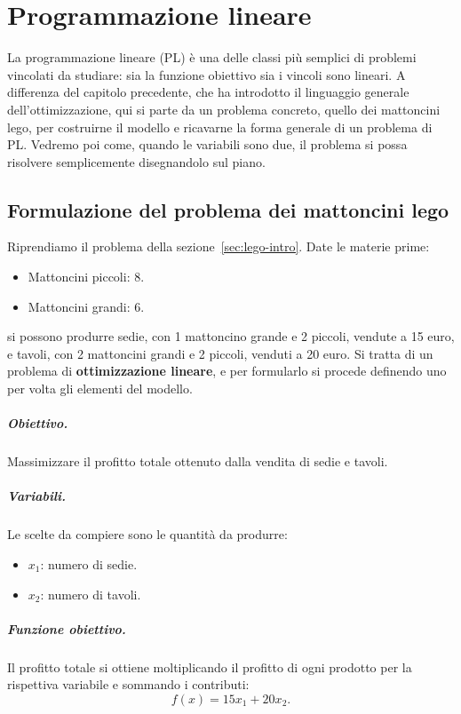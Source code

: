 \chapter{Programmazione lineare}\label{ch:pl}
La programmazione lineare (PL) è una delle classi più semplici di problemi vincolati da studiare: sia la funzione obiettivo sia i vincoli sono lineari. A differenza del capitolo precedente, che ha introdotto il linguaggio generale dell'ottimizzazione, qui si parte da un problema concreto, quello dei mattoncini lego, per costruirne il modello e ricavarne la forma generale di un problema di PL. Vedremo poi come, quando le variabili sono due, il problema si possa risolvere semplicemente disegnandolo sul piano.

\section{Formulazione del problema dei mattoncini lego}\label{sec:lego-form}
Riprendiamo il problema della sezione~\ref{sec:lego-intro}. Date le materie prime:
\begin{itemize}
    \item Mattoncini piccoli: 8.
    \item Mattoncini grandi: 6.
\end{itemize}
si possono produrre sedie, con 1 mattoncino grande e 2 piccoli, vendute a 15 euro, e tavoli, con 2 mattoncini grandi e 2 piccoli, venduti a 20 euro. Si tratta di un problema di \textbf{ottimizzazione lineare}, e per formularlo si procede definendo uno per volta gli elementi del modello.

\paragraph{Obiettivo.}
Massimizzare il profitto totale ottenuto dalla vendita di sedie e tavoli.

\paragraph{Variabili.}
Le scelte da compiere sono le quantità da produrre:
\begin{itemize}
    \item $x_1$: numero di sedie.
    \item $x_2$: numero di tavoli.
\end{itemize}

\paragraph{Funzione obiettivo.}
Il profitto totale si ottiene moltiplicando il profitto di ogni prodotto per la rispettiva variabile e sommando i contributi:
\[
f(x) = 15x_1 + 20x_2.
\]

